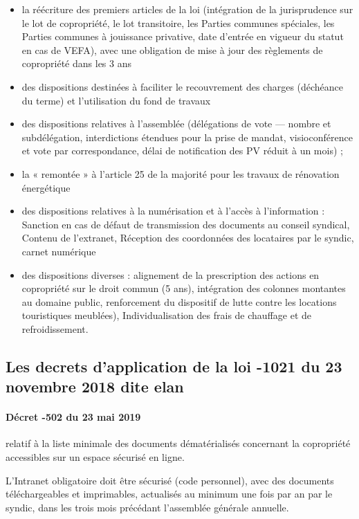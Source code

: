 \begin{enumerate}[label=\roman*)]
				\begin{itemize}
					\item la réécriture des premiers articles de la loi (intégration de la jurisprudence sur le lot de copropriété, le lot transitoire, les Parties communes spéciales, les Parties communes à jouissance privative, date d’entrée en vigueur du statut en cas de VEFA), avec une obligation de mise à jour des règlements de copropriété dans les 3 ans
					\item  des dispositions destinées à faciliter le recouvrement des charges (déchéance du terme) et l’utilisation du fond de travaux
					\item  des dispositions relatives à l’assemblée (délégations de vote --- nombre et subdélégation, interdictions étendues pour la prise de mandat, visioconférence et vote par correspondance, délai de notification des PV réduit à un mois) ;
					\item  la « remontée » à l’article 25 de la majorité pour les travaux de rénovation énergétique
					\item  des dispositions relatives à la numérisation et à l’accès à l’information : Sanction en cas de défaut de transmission des documents au conseil syndical, Contenu de l’extranet, Réception des coordonnées des locataires par le syndic, carnet numérique
					\item  des dispositions diverses : alignement de la prescription des actions en copropriété sur le droit commun (5 ans), intégration des colonnes montantes au domaine public, renforcement du dispositif de lutte contre les locations touristiques meublées), Individualisation des frais de chauffage et de refroidissement.
				\end{itemize}
			\end{enumerate}

		\subsection{Les decrets d’application de la loi -1021 du 23 novembre 2018 dite elan}
			\paragraph{Décret -502 du 23 mai 2019} relatif à la liste minimale des documents dématérialisés concernant la copropriété accessibles sur un espace sécurisé en ligne.
			
			L’Intranet obligatoire doit être sécurisé (code personnel), avec des documents téléchargeables et imprimables, actualisés au minimum une fois par an par le syndic, dans les trois mois précédant l'assemblée générale annuelle.
			
